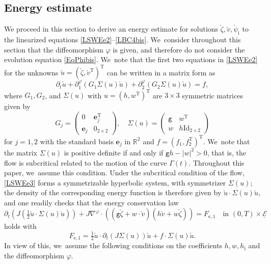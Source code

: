 \documentclass[11pt]{article}
\newcommand{\gr}{{\mathtt g}}
\newcommand{\R}{{\mathbb R}}
\newcommand{\dt}{\partial_t}
\newcommand{\cE}{{\mathcal E}}
\newcommand{\ul}[1]{\underline{#1}}
\newcommand{\itGamma}{\mathit{\Gamma}}
\theoremstyle{definition}
\begin{document}
\subsection{Energy estimate}
We proceed in this section to derive an energy estimate for solutions $\check{\zeta},\check{v},\check{\psi}_\mathrm{i}$ to the linearized equations
\eqref{LSWEe2}--\eqref{LBC4bis}. We~consider throughout this section that the diffeomorphism $\varphi$ is given, and therefore do not consider the evolution equation \eqref{EqPhibis}. We~note that the first two equations in \eqref{LSWEe2} for the unknowns $\check{u}=(\check{\zeta},\check{v}^\mathrm{T})^\mathrm{T}$
can be written in a matrix form as
\begin{equation}\label{LSWEe3}
\dt\check{u}+\partial_1^\varphi(G_1\Sigma(u)\check{u})+\partial_2^\varphi(G_2\Sigma(u)\check{u})=f,
\end{equation}
where $G_1,G_2$, and $\Sigma(u)$ with $u=(h,w^\mathrm{T})^\mathrm{T}$ are $3\times3$ symmetric matrices given by
\[
G_j=
\begin{pmatrix}
0 & \mathbf{e}_j^\mathrm{T} \\
\mathbf{e}_j & 0_{2\times2}
\end{pmatrix}, \quad
\Sigma(u)=
\begin{pmatrix}
\gr & w^\mathrm{T} \\
w & h\mathrm{Id}_{2\times2}
\end{pmatrix}
\]
for $j=1,2$ with the standard basis $\mathbf{e}_j$ in $\R^2$ and $f=(f_1,f_2^\mathrm{T})^\mathrm{T}$. We~note that the matrix $\Sigma(u)$ is positive definite if and only if $\gr h-|w|^2>0$, that is,
the flow is subcritical related to the motion of the curve $\itGamma(t)$.
Throughout this paper, we~assume this condition.
Under the subcritical condition of the flow, \eqref{LSWEe3} forms a symmetrizable hyperbolic system, with symmetrizer $\Sigma(u)$;
the density of the corresponding energy function is therefore given by $\check{u}\cdot\Sigma(u)\check{u}$,
and one readily checks that the energy conservation law
\begin{equation}\label{localCE}
\dt(J(\tfrac12\check{u}\cdot\Sigma(u)\check{u}))
+ J\nabla^\varphi\cdot((\gr\check{\zeta}+w\cdot\check{v})(h\check{v}+w\check{\zeta})) = F_\mathrm{e,1}
\quad\text{in } (0,T)\times\ul{\cE}
\end{equation}
holds with
\[
F_\mathrm{e,1}=\tfrac{1}{2}\check{u}\cdot\dt (J\Sigma(u))\check{u} + f\cdot \Sigma(u)\check{u}.
\]
In view of this, we~assume the following conditions on the coefficients $h,w,h_\mathrm{i}$ and the diffeomorphism $\varphi$.
\end{document}
